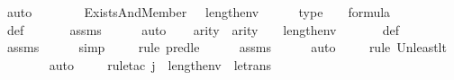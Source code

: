 \begin{isabellebody}
\ auto\isanewline
\isanewline
\ \ \isamarkupfalse%
\ {\isasympsi}\ \ {\isachardoublequoteopen}{\isasympsi}\ {\isasymequiv}\ Exists{\isacharparenleft}{\kern0pt}And{\isacharparenleft}{\kern0pt}Member{\isacharparenleft}{\kern0pt}{}{\isacharcomma}{\kern0pt}\ {}\ {\isacharhash}{\kern0pt}{\isacharplus}{\kern0pt}\ length{\isacharparenleft}{\kern0pt}env{\isacharparenright}{\kern0pt}{\isacharparenright}{\kern0pt}{\isacharcomma}{\kern0pt}\ {\isasymphi}{\isacharparenright}{\kern0pt}{\isacharparenright}{\kern0pt}{\isachardoublequoteclose}\ \isanewline
\isanewline
\ \ \isamarkupfalse%
\ {\isasympsi}{\isacharunderscore}{\kern0pt}type\ {\isacharcolon}{\kern0pt}\ {\isachardoublequoteopen}{\isasympsi}\ {\isasymin}\ formula{\isachardoublequoteclose}\ \isanewline
\ \ \ \ \isamarkupfalse%
\ {\isasympsi}{\isacharunderscore}{\kern0pt}def\ \isanewline
\ \ \ \ \isamarkupfalse%
\ assms\isanewline
\ \ \ \ \isamarkupfalse%
\ auto\isanewline
\isanewline
\ \ \isamarkupfalse%
\ arity{\isacharunderscore}{\kern0pt}{\isasympsi}\ {\isacharcolon}{\kern0pt}\ {\isachardoublequoteopen}arity{\isacharparenleft}{\kern0pt}{\isasympsi}{\isacharparenright}{\kern0pt}\ {\isasymle}\ {}\ {\isacharhash}{\kern0pt}{\isacharplus}{\kern0pt}\ length{\isacharparenleft}{\kern0pt}env{\isacharparenright}{\kern0pt}{\isachardoublequoteclose}\ \isanewline
\ \ \ \ \isamarkupfalse%
\ {\isasympsi}{\isacharunderscore}{\kern0pt}def\isanewline
\ \ \ \ \isamarkupfalse%
\ assms\isanewline
\ \ \ \ \isamarkupfalse%
\ simp\isanewline
\ \ \ \ \isamarkupfalse%
{\isacharparenleft}{\kern0pt}rule\ pred{\isacharunderscore}{\kern0pt}le{\isacharparenright}{\kern0pt}\isanewline
\ \ \ \ \isamarkupfalse%
\ assms\isanewline
\ \ \ \ \isamarkupfalse%
\ auto{\isacharbrackleft}{\kern0pt}{}{\isacharbrackright}{\kern0pt}\isanewline
\ \ \ \ \isamarkupfalse%
{\isacharparenleft}{\kern0pt}rule\ Un{\isacharunderscore}{\kern0pt}least{\isacharunderscore}{\kern0pt}lt{\isacharparenright}{\kern0pt}{\isacharplus}{\kern0pt}\isanewline
\ \ \ \ \ \ \isamarkupfalse%
\ auto{\isacharbrackleft}{\kern0pt}{}{\isacharbrackright}{\kern0pt}\isanewline
\ \ \ \ \isamarkupfalse%
{\isacharparenleft}{\kern0pt}rule{\isacharunderscore}{\kern0pt}tac\ j{\isacharequal}{\kern0pt}{\isachardoublequoteopen}{}\ {\isacharhash}{\kern0pt}{\isacharplus}{\kern0pt}\ length{\isacharparenleft}{\kern0pt}env{\isacharparenright}{\kern0pt}{\isachardoublequoteclose}\ \ le{\isacharunderscore}{\kern0pt}trans{\isacharparenright}{\kern0pt}\ \isanewline

\end{isabellebody}
